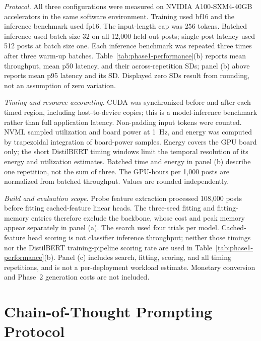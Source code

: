 \documentclass{ieeeaccess}
\begin{document}
\par\smallskip
\noindent\textit{Protocol.} All three configurations were measured on NVIDIA A100-SXM4-40GB accelerators in the same software environment. Training used bf16 and the inference benchmark used fp16. The input-length cap was 256 tokens. Batched inference used batch size 32 on all 12,000 held-out posts; single-post latency used 512 posts at batch size one. Each inference benchmark was repeated three times after three warm-up batches. Table~\ref{tab:phase1-performance}(b) reports mean throughput, mean p50 latency, and their across-repetition SDs; panel (b) above reports mean p95 latency and its SD. Displayed zero SDs result from rounding, not an assumption of zero variation.
\par\smallskip
\noindent\textit{Timing and resource accounting.} CUDA was synchronized before and after each timed region, including host-to-device copies; this is a model-inference benchmark rather than full application latency. Non-padding input tokens were counted. NVML sampled utilization and board power at 1~Hz, and energy was computed by trapezoidal integration of board-power samples. Energy covers the GPU board only; the short DistilBERT timing windows limit the temporal resolution of its energy and utilization estimates. Batched time and energy in panel (b) describe one repetition, not the sum of three. The GPU-hours per 1,000 posts are normalized from batched throughput. Values are rounded independently.
\par\smallskip
\noindent\textit{Build and evaluation scope.} Probe feature extraction processed 108,000 posts before fitting cached-feature linear heads. The three-seed fitting and fitting-memory entries therefore exclude the backbone, whose cost and peak memory appear separately in panel (a). The search used four trials per model. Cached-feature head scoring is not classifier inference throughput; neither those timings nor the DistilBERT training-pipeline scoring rate are used in Table~\ref{tab:phase1-performance}(b). Panel (c) includes search, fitting, scoring, and all timing repetitions, and is not a per-deployment workload estimate. Monetary conversion and Phase~2 generation costs are not included.
\normalsize
\par\medskip

\section{Chain-of-Thought Prompting Protocol}
\end{document}
